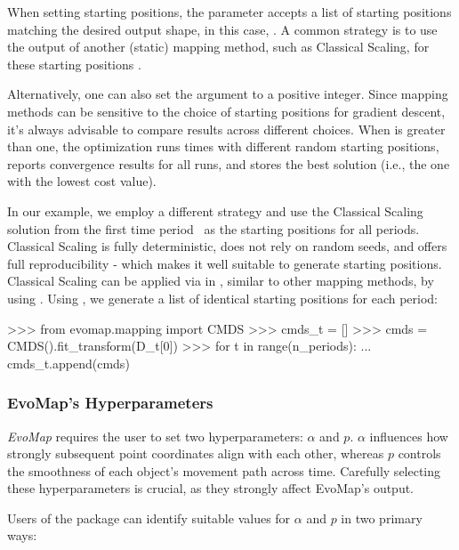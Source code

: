 \documentclass[article]{jss}
\begin{document}
When setting starting positions, the  parameter accepts a list of starting positions matching
 the desired output shape, in this case, . A common strategy is to use the output of 
 another (static) mapping method, such as Classical Scaling, for these starting positions \citep{DeLeeuw+Mair:2009}.

Alternatively, one can also set the  argument to a positive integer. Since mapping methods 
can be sensitive to the choice of starting positions for gradient descent, it's always advisable to compare results
across different choices. When  is greater than one, the optimization runs  times with 
different random starting positions, reports convergence results for all runs, and stores the best solution 
(i.e., the one with the lowest cost value).

In our example, we employ a different strategy and use the Classical Scaling solution from the first time period \
as the starting positions for all periods. Classical Scaling is fully deterministic, does not rely on random seeds, 
and offers full reproducibility - which makes it well suitable to generate starting positions. 
Classical Scaling can be applied via  in \code{evomap.mapping}, similar to other 
mapping methods, by using \code{fit\_transform()}. Using \code{CMDS}, we generate a list of identical starting positions 
for each period:

\begin{CodeChunk}
\begin{CodeInput}
>>> from evomap.mapping import CMDS
>>> cmds_t = []
>>> cmds = CMDS().fit_transform(D_t[0])
>>> for t in range(n_periods):
...     cmds_t.append(cmds)
\end{CodeInput}
\end{CodeChunk}

\subsubsection{EvoMap's Hyperparameters}

\emph{EvoMap} requires the user to set two hyperparameters: $\alpha$ and $p$. 
$\alpha$ influences how strongly subsequent point coordinates align with each other, 
whereas $p$ controls the smoothness of each object's movement path across time. Carefully selecting
these hyperparameters is crucial, as they strongly affect EvoMap's output. 

Users of the  package can identify suitable values for $\alpha$ and $p$ in two primary ways: 
\end{document}
